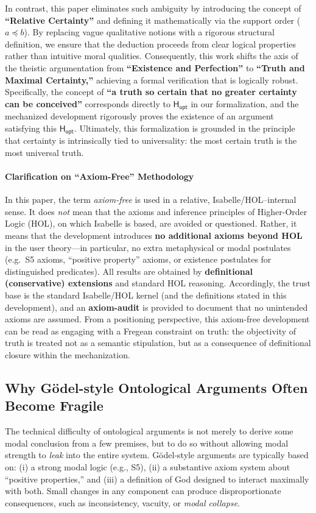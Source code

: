 \documentclass[a4paper, 11pt]{article}
\theoremstyle{plain}
\theoremstyle{definition}
\newcommand{\Hopt}{\mathsf{H_{opt}}}       %
\begin{document}
In contrast, this paper eliminates such ambiguity by introducing the concept of \textbf{``Relative Certainty''} and defining it mathematically via the support order ($a \preceq b$). By replacing vague qualitative notions with a rigorous structural definition, we ensure that the deduction proceeds from clear logical properties rather than intuitive moral qualities. Consequently, this work shifts the axis of the theistic argumentation from \textbf{``Existence and Perfection''} to \textbf{``Truth and Maximal Certainty,''} achieving a formal verification that is logically robust. Specifically, the concept of \textbf{``a truth so certain that no greater certainty can be conceived''} corresponds directly to $\Hopt$ in our formalization, and the mechanized development rigorously proves the existence of an argument satisfying this $\Hopt$. Ultimately, this formalization is grounded in the principle that certainty is intrinsically tied to universality: the most certain truth is the most universal truth.

\paragraph{Clarification on ``Axiom-Free'' Methodology}
In this paper, the term \emph{axiom-free} is used in a relative, Isabelle/HOL--internal sense.
It does \emph{not} mean that the axioms and inference principles of Higher-Order Logic (HOL),
on which Isabelle is based, are avoided or questioned.
Rather, it means that the development introduces \textbf{no additional axioms beyond HOL}
in the user theory---in particular, no extra metaphysical or modal postulates
(e.g.\ S5 axioms, ``positive property'' axioms, or existence postulates for distinguished predicates).
All results are obtained by \textbf{definitional (conservative) extensions} and standard HOL reasoning.
Accordingly, the trust base is the standard Isabelle/HOL kernel (and the definitions stated in this development),
and an \textbf{axiom-audit} is provided to document that no unintended axioms are assumed. From a positioning perspective, this axiom-free development can be read as engaging with a Fregean constraint on truth: the objectivity of truth is treated not as a semantic stipulation, but as a consequence of definitional closure within the mechanization.

\subsection{Why G\"odel-style Ontological Arguments Often Become Fragile}
The technical difficulty of ontological arguments is not merely to derive some modal conclusion from a few premises, but to do so without allowing modal strength to \emph{leak} into the entire system. G\"odel-style arguments are typically based on: (i) a strong modal logic (e.g., S5), (ii) a substantive axiom system about ``positive properties,'' and (iii) a definition of God designed to interact maximally with both. Small changes in any component can produce disproportionate consequences, such as inconsistency, vacuity, or \emph{modal collapse}.
\end{document}
